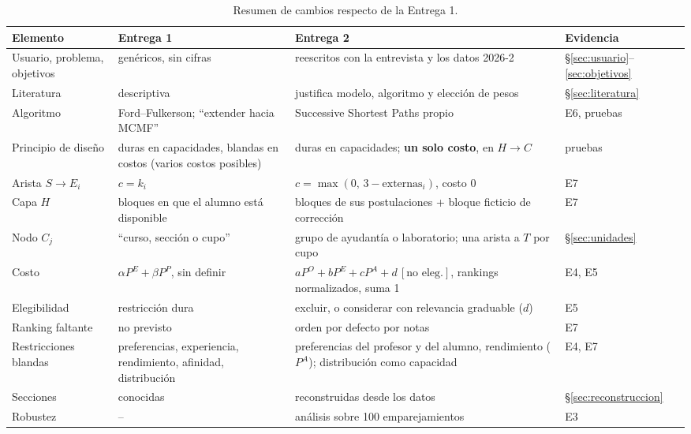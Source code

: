 \documentclass{article}
\begin{document}
\begin{table}[H]
\centering
\small
\begin{tabularx}{\textwidth}{>{\raggedright\arraybackslash}p{2.5cm} >{\raggedright\arraybackslash}X >{\raggedright\arraybackslash}X l}
\toprule
\textbf{Elemento} & \textbf{Entrega 1} & \textbf{Entrega 2} & \textbf{Evidencia} \\
\midrule
Usuario, problema, objetivos & genéricos, sin cifras & reescritos con la entrevista y los datos 2026-2 & §\ref{sec:usuario}--\ref{sec:objetivos} \\
Literatura & descriptiva & justifica modelo, algoritmo y elección de pesos & §\ref{sec:literatura} \\
Algoritmo & Ford--Fulkerson; ``extender hacia MCMF'' & Successive Shortest Paths propio & E6, pruebas \\
Principio de diseño & duras en capacidades, blandas en costos (varios costos posibles) & duras en capacidades; \textbf{un solo costo}, en $H \to C$ & pruebas \\
Arista $S \to E_i$ & $c = k_i$ & $c = \max(0,\, 3 - \text{externas}_i)$, costo 0 & E7 \\
Capa $H$ & bloques en que el alumno está disponible & bloques de sus postulaciones + bloque ficticio de corrección & E7 \\
Nodo $C_j$ & ``curso, sección o cupo'' & grupo de ayudantía o laboratorio; una arista a $T$ por cupo & §\ref{sec:unidades} \\
Costo & $\alpha P^E + \beta P^P$, sin definir & $aP^O + bP^E + cP^A + d\,[\text{no eleg.}]$, rankings normalizados, suma 1 & E4, E5 \\
Elegibilidad & restricción dura & excluir, o considerar con relevancia graduable ($d$) & E5 \\
Ranking faltante & no previsto & orden por defecto por notas & E7 \\
Restricciones blandas & preferencias, experiencia, rendimiento, afinidad, distribución & preferencias del profesor y del alumno, rendimiento ($P^A$); distribución como capacidad & E4, E7 \\
Secciones & conocidas & reconstruidas desde los datos & §\ref{sec:reconstruccion} \\
Robustez & -- & análisis sobre 100 emparejamientos & E3 \\
\bottomrule
\end{tabularx}
\caption{Resumen de cambios respecto de la Entrega 1.}
\label{tab:cambios}
\end{table}
\end{document}
